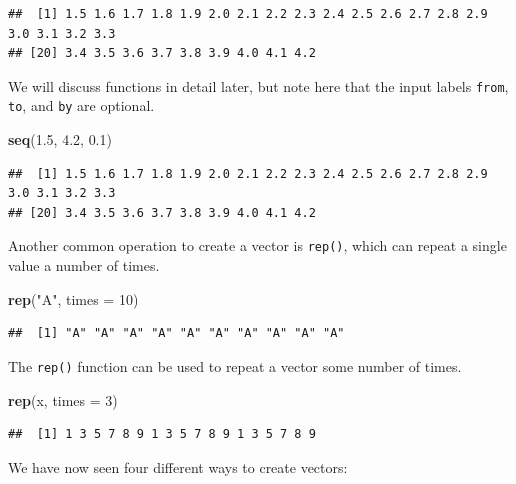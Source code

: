 \documentclass[]{book}
\newenvironment{Shaded}{\begin{snugshade}}{\end{snugshade}}
\newcommand{\KeywordTok}[1]{\textcolor[rgb]{0.13,0.29,0.53}{\textbf{#1}}}
\newcommand{\DataTypeTok}[1]{\textcolor[rgb]{0.13,0.29,0.53}{#1}}
\newcommand{\DecValTok}[1]{\textcolor[rgb]{0.00,0.00,0.81}{#1}}
\newcommand{\FloatTok}[1]{\textcolor[rgb]{0.00,0.00,0.81}{#1}}
\newcommand{\StringTok}[1]{\textcolor[rgb]{0.31,0.60,0.02}{#1}}
\newcommand{\NormalTok}[1]{#1}
\begin{document}
\begin{verbatim}
##  [1] 1.5 1.6 1.7 1.8 1.9 2.0 2.1 2.2 2.3 2.4 2.5 2.6 2.7 2.8 2.9 3.0 3.1 3.2 3.3
## [20] 3.4 3.5 3.6 3.7 3.8 3.9 4.0 4.1 4.2
\end{verbatim}

We will discuss functions in detail later, but note here that the input
labels \texttt{from}, \texttt{to}, and \texttt{by} are optional.

\begin{Shaded}
\begin{Highlighting}[]
\KeywordTok{seq}\NormalTok{(}\FloatTok{1.5}\NormalTok{, }\FloatTok{4.2}\NormalTok{, }\FloatTok{0.1}\NormalTok{)}
\end{Highlighting}
\end{Shaded}

\begin{verbatim}
##  [1] 1.5 1.6 1.7 1.8 1.9 2.0 2.1 2.2 2.3 2.4 2.5 2.6 2.7 2.8 2.9 3.0 3.1 3.2 3.3
## [20] 3.4 3.5 3.6 3.7 3.8 3.9 4.0 4.1 4.2
\end{verbatim}

Another common operation to create a vector is \texttt{rep()}, which can
repeat a single value a number of times.

\begin{Shaded}
\begin{Highlighting}[]
\KeywordTok{rep}\NormalTok{(}\StringTok{"A"}\NormalTok{, }\DataTypeTok{times =} \DecValTok{10}\NormalTok{)}
\end{Highlighting}
\end{Shaded}

\begin{verbatim}
##  [1] "A" "A" "A" "A" "A" "A" "A" "A" "A" "A"
\end{verbatim}

The \texttt{rep()} function can be used to repeat a vector some number
of times.

\begin{Shaded}
\begin{Highlighting}[]
\KeywordTok{rep}\NormalTok{(x, }\DataTypeTok{times =} \DecValTok{3}\NormalTok{)}
\end{Highlighting}
\end{Shaded}

\begin{verbatim}
##  [1] 1 3 5 7 8 9 1 3 5 7 8 9 1 3 5 7 8 9
\end{verbatim}

We have now seen four different ways to create vectors:
\end{document}
